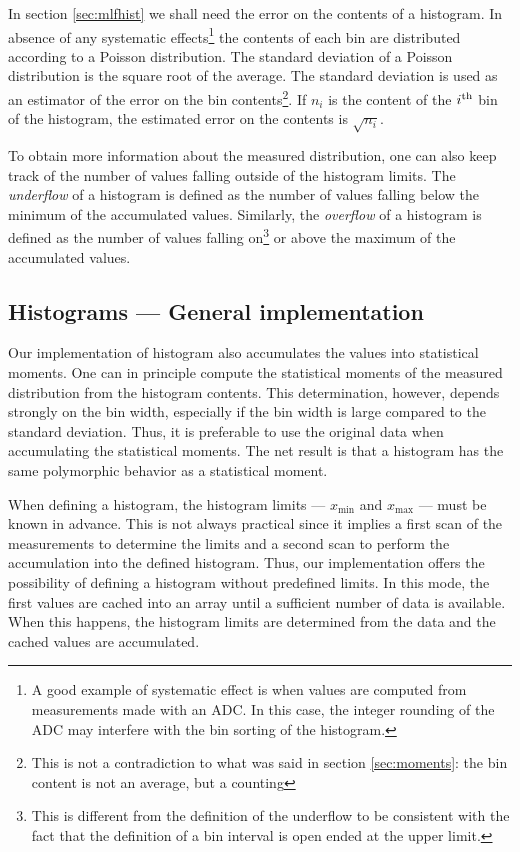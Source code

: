 \documentclass[twoside]{book}
\begin{document}
In section \ref{sec:mlfhist} we shall need the error on the
contents of a histogram. In absence of any systematic
effects\footnote{A good example of systematic effect is when
values are computed from measurements made with an ADC. In this
case, the integer rounding of the ADC may interfere with the bin
sorting of the histogram.} the contents of each bin are
distributed according to a Poisson distribution. The standard
deviation of a Poisson distribution is the square root of the
average. The standard deviation is used as an estimator of the
error on the bin contents\footnote{This is not a contradiction to
what was said in section \ref{sec:moments}: the bin content is not
an average, but a counting}. If $n_i$ is the content of the $i^{\mathop{\rm th}}$
bin of the histogram, the estimated error on the contents is
$\sqrt{n_i}$.

To obtain more information about the measured distribution, one
can also keep track of the number of values falling outside of the
histogram limits. The {\sl underflow} of a histogram is defined as
the number of values falling below the minimum  of the accumulated
values. Similarly, the {\sl overflow} of a histogram is defined as
the number of values falling on\footnote{This is different from
the definition of the underflow to be consistent with the fact
that the definition of a bin interval is open ended at the upper
limit.} or above the maximum of the accumulated values.

\subsection{Histograms --- General implementation}
 Our implementation of histogram also
accumulates the values into statistical moments. One can in
principle compute the statistical moments of the measured
distribution from the histogram contents. This determination,
however, depends strongly on the bin width, especially if the bin
width is large compared to the standard deviation. Thus, it is
preferable to use the original data when accumulating the
statistical moments. The net result is that a histogram has the
same polymorphic behavior as a statistical moment.

When defining a histogram, the histogram limits --- $x_{\min}$ and
$x_{\max}$ --- must be known in advance. This is not always
practical since it implies a first scan of the measurements to
determine the limits and a second scan to perform the accumulation
into the defined histogram. Thus, our implementation offers the
possibility of defining a histogram without predefined limits. In
this mode, the first values are cached into an array until a
sufficient number of data is available. When this happens, the
histogram limits are determined from the data and the cached
values are accumulated.
\end{document}
